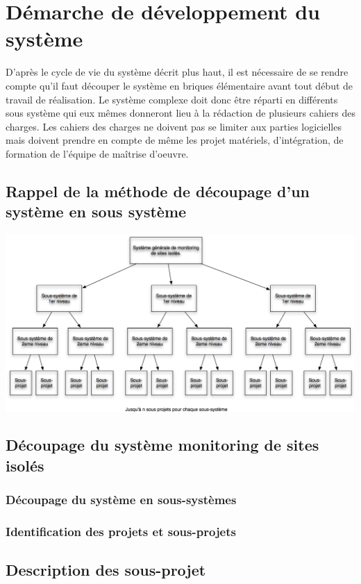 \section{Démarche de développement du système}
D'après le cycle de vie du système décrit plus haut, il est nécessaire de se rendre compte qu'il faut découper le système en briques élémentaire avant tout début de travail de réalisation. Le système complexe doit donc être réparti en différents sous système qui eux mêmes donneront lieu à la rédaction de plusieurs cahiers des charges. Les cahiers des charges ne doivent pas se limiter aux parties logicielles mais doivent prendre en compte de même les projet matériels, d'intégration, de formation de l'équipe de maîtrise d'oeuvre.

\subsection{Rappel de la méthode de découpage d'un système en sous système}

\begin {center}
\includegraphics[width=\textwidth]{png/decoupageType.png}
\end {center}


\subsection{Découpage du système monitoring de sites isolés}
\subsubsection{Découpage du système en sous-systèmes}
\subsubsection{Identification des projets et sous-projets}
\subsection{Description des sous-projet}
